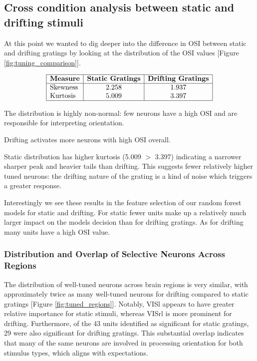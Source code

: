 \documentclass[10pt,twocolumn]{article}
\begin{document}
\subsection{Cross condition analysis between static and drifting stimuli}

At this point we wanted to dig deeper into the difference in OSI between static and drifting gratings by looking at the distribution of the OSI values [Figure \ref{fig:tuning_comparison}]. 

\[
\begin{array}{|l|c|c|}
\hline
\textbf{Measure} & \textbf{Static Gratings} & \textbf{Drifting Gratings} \\
\hline
\text{Skewness} & 2.258 & 1.937 \\
\text{Kurtosis} & 5.009 & 3.397 \\
\hline
\end{array}
\]

The distribution is highly non-normal: few neurons have a high OSI and are responsible for interpreting orientation.

Drifting activates more neurons with high OSI overall.

Static distribution has higher kurtosis (5.009 $>$ 3.397) indicating a narrower sharper peak and heavier tails than drifting. This suggests fewer relatively higher tuned neurons: the drifting nature of the grating is a kind of noise which triggers a greater response.

Interestingly we see these results in the feature selection of our random forest models for static and drifting. For static fewer units make up a relatively much larger impact on the models decision than for drifting gratings. As for drifting many units have a high OSI value. 

\subsubsection{Distribution and Overlap of Selective Neurons Across Regions}

The distribution of well-tuned neurons across brain regions is very similar, with approximately twice as many well-tuned neurons for drifting compared to static gratings [Figure \ref{fig:tuned_regions}]. Notably, VISl appears to have greater relative importance for static stimuli, whereas VISrl is more prominent for drifting. Furthermore, of the 43 units identified as significant for static gratings, 29 were also significant for drifting gratings. This substantial overlap indicates that many of the same neurons are involved in processing orientation for both stimulus types, which aligns with expectations.
\end{document}
